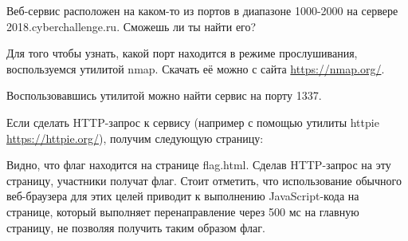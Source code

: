 
Веб-сервис расположен на каком-то из портов в диапазоне 1000-2000 на сервере 2018.cyberchallenge.ru. Сможешь ли ты найти его?

\solutionSection

Для того чтобы узнать, какой порт находится в режиме прослушивания, воспользуемся утилитой nmap. Скачать её можно с сайта \url{https://nmap.org/}. 

Воспользовавшись утилитой можно найти сервис на порту 1337.


Если сделать HTTP-запрос к сервису (например с помощью утилиты httpie \url{https://httpie.org/}), получим следующую страницу:


Видно, что флаг находится на странице flag.html. Сделав HTTP-запрос на эту страницу, участники получат флаг. Стоит отметить, что использование обычного веб-браузера для этих целей приводит к выполнению JavaScript-кода на странице, который выполняет перенаправление через 500 мс на главную страницу, не позволяя получить таким образом флаг.


